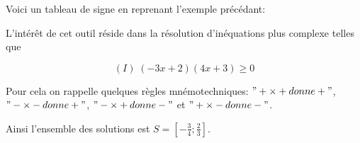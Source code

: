 \documentclass[french]{book}
\begin{document}
Voici un tableau de signe en reprenant l'exemple précédant:
\begin{center}
\end{center}

L'intérêt de cet outil réside dans la résolution d'inéquations plus complexe telles que 

$$(I) \;  (-3x+2)(4x+3)\geq 0$$

Pour cela on rappelle quelques règles mnémotechniques: $"+ \times + donne +"$, $"- \times - donne +"$, $"- \times + donne -"$ et $"+ \times - donne -"$.  

\begin{center}
\end{center}

Ainsi l'ensemble des solutions est 
$ S= [-\frac{3}{4}; \frac{2}{3}] $.
\end{document}

